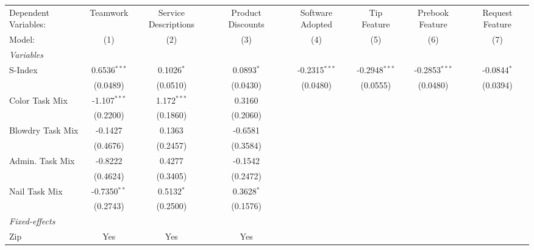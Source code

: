 
\begingroup
\centering
\begin{tabular}{lccccccc}
   \tabularnewline \midrule \midrule
   Dependent Variables: & Teamwork       & Service Descriptions & Product Discounts & Software Adopted & Tip Feature     & Prebook Feature & Request Feature\\  
   Model:               & (1)            & (2)                  & (3)               & (4)              & (5)             & (6)             & (7)\\  
   \midrule
   \emph{Variables}\\
   S-Index              & 0.6536$^{***}$ & 0.1026$^{*}$         & 0.0893$^{*}$      & -0.2315$^{***}$  & -0.2948$^{***}$ & -0.2853$^{***}$ & -0.0844$^{*}$\\   
                        & (0.0489)       & (0.0510)             & (0.0430)          & (0.0480)         & (0.0555)        & (0.0480)        & (0.0394)\\   
   Color Task Mix       & -1.107$^{***}$ & 1.172$^{***}$        & 0.3160            &                  &                 &                 &   \\   
                        & (0.2200)       & (0.1860)             & (0.2060)          &                  &                 &                 &   \\   
   Blowdry Task Mix     & -0.1427        & 0.1363               & -0.6581           &                  &                 &                 &   \\   
                        & (0.4676)       & (0.2457)             & (0.3584)          &                  &                 &                 &   \\   
   Admin. Task Mix      & -0.8222        & 0.4277               & -0.1542           &                  &                 &                 &   \\   
                        & (0.4624)       & (0.3405)             & (0.2472)          &                  &                 &                 &   \\   
   Nail Task Mix        & -0.7350$^{**}$ & 0.5132$^{*}$         & 0.3628$^{*}$      &                  &                 &                 &   \\   
                        & (0.2743)       & (0.2500)             & (0.1576)          &                  &                 &                 &   \\   
   \midrule
   \emph{Fixed-effects}\\
   Zip                  & Yes            & Yes                  & Yes               &                  &                 &                 & \\  

\end{tabular}

